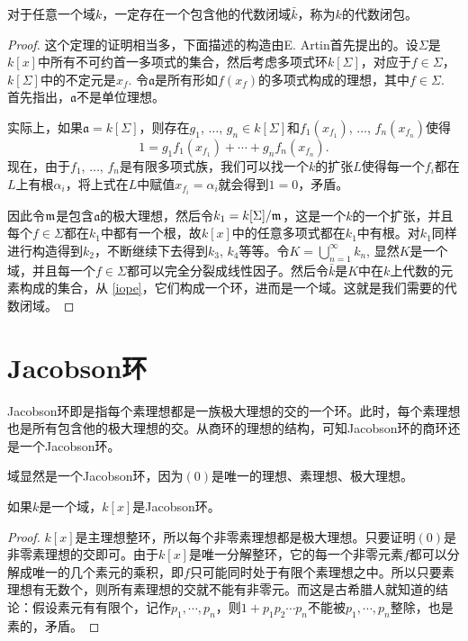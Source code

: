 \begin{thm}
对于任意一个域$k$，一定存在一个包含他的代数闭域$\bar{k}$，称为$k$的代数闭包。
\end{thm}

\begin{proof}
	这个定理的证明相当多，下面描述的构造由E. Artin首先提出的。设$\Sigma$是$k[x]$中所有不可约首一多项式的集合，然后考虑多项式环$k[\Sigma]$，对应于$f\in\Sigma$，$k[\Sigma]$中的不定元是$x_f$. 令$\mathfrak{a}$是所有形如$f(x_f)$的多项式构成的理想，其中$f\in\Sigma$. 首先指出，$\mathfrak{a}$不是单位理想。

	实际上，如果$\mathfrak{a}=k[\Sigma]$，则存在$g_1$, $\dots$, $g_n\in k[\Sigma]$和$f_1(x_{f_1})$, $\dots$, $f_n(x_{f_n})$使得
	\[
	1=g_1f_1(x_{f_1})+\cdots +g_nf_n(x_{f_n}).
	\]
	现在，由于$f_1$, $\dots$, $f_n$是有限多项式族，我们可以找一个$k$的扩张$L$使得每一个$f_i$都在$L$上有根$\alpha_i$，将上式在$L$中赋值$x_{f_i}=\alpha_i$就会得到$1=0$，矛盾。

	因此令$\mathfrak{m}$是包含$\mathfrak{a}$的极大理想，然后令$k_1=k[\Sigma]/\mathfrak{m}$，这是一个$k$的一个扩张，并且每个$f\in \Sigma$都在$k_1$中都有一个根，故$k[x]$中的任意多项式都在$k_1$中有根。对$k_1$同样进行构造得到$k_2$，不断继续下去得到$k_3$, $k_4$等等。令$K=\bigcup_{n=1}^\infty k_n$, 显然$K$是一个域，并且每一个$f\in \Sigma$都可以完全分裂成线性因子。然后令$\bar{k}$是$K$中在$k$上代数的元素构成的集合，从 \ref{iope}，它们构成一个环，进而是一个域。这就是我们需要的代数闭域。
\end{proof}

\section{Jacobson环}

\begin{para}[Jacobson环]
	Jacobson环即是指每个素理想都是一族极大理想的交的一个环。此时，每个素理想也是所有包含他的极大理想的交。从商环的理想的结构，可知Jacobson环的商环还是一个Jacobson环。
\end{para}

域显然是一个Jacobson环，因为$(0)$是唯一的理想、素理想、极大理想。

\begin{lem}
	如果$k$是一个域，$k[x]$是Jacobson环。
\end{lem}

\begin{proof}
	$k[x]$是主理想整环，所以每个非零素理想都是极大理想。只要证明$(0)$是非零素理想的交即可。由于$k[x]$是唯一分解整环，它的每一个非零元素$f$都可以分解成唯一的几个素元的乘积，即$f$只可能同时处于有限个素理想之中。所以只要素理想有无数个，则所有素理想的交就不能有非零元。而这是古希腊人就知道的结论：假设素元有有限个，记作$p_1,\cdots,p_n$，则$1+p_1p_2\cdots p_n$不能被$p_1,\cdots,p_n$整除，也是素的，矛盾。
\end{proof}

